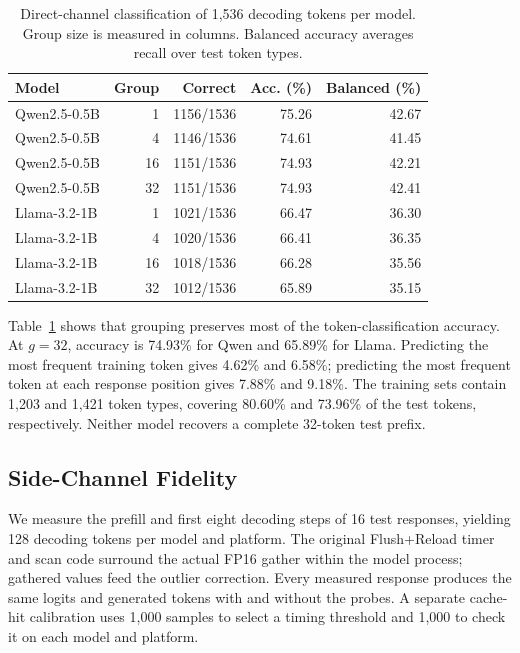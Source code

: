 \begin{table}[H]
    \centering\footnotesize\setlength{\tabcolsep}{3pt}
    \caption{Direct-channel classification of 1,536 decoding tokens per model. Group size is measured in columns. Balanced accuracy averages recall over test token types.}
    \label{tab:decoding-direct}
    \begin{tabular}{@{}lrrrr@{}}
        \hline
        Model & Group & Correct & Acc. (\%) & Balanced (\%) \\\hline
        Qwen2.5-0.5B & 1 & 1156/1536 & 75.26 & 42.67 \\
        Qwen2.5-0.5B & 4 & 1146/1536 & 74.61 & 41.45 \\
        Qwen2.5-0.5B & 16 & 1151/1536 & 74.93 & 42.21 \\
        Qwen2.5-0.5B & 32 & 1151/1536 & 74.93 & 42.41 \\
        Llama-3.2-1B & 1 & 1021/1536 & 66.47 & 36.30 \\
        Llama-3.2-1B & 4 & 1020/1536 & 66.41 & 36.35 \\
        Llama-3.2-1B & 16 & 1018/1536 & 66.28 & 35.56 \\
        Llama-3.2-1B & 32 & 1012/1536 & 65.89 & 35.15 \\
        \hline
    \end{tabular}
\end{table}

Table~\ref{tab:decoding-direct} shows that grouping preserves most of the token-classification accuracy.
At $g=32$, accuracy is 74.93\% for Qwen and 65.89\% for Llama.
Predicting the most frequent training token gives 4.62\% and 6.58\%; predicting the most frequent token at each response position gives 7.88\% and 9.18\%.
The training sets contain 1,203 and 1,421 token types, covering 80.60\% and 73.96\% of the test tokens, respectively.
Neither model recovers a complete 32-token test prefix.

\subsection{Side-Channel Fidelity}
\label{sec:decoding-fidelity}

We measure the prefill and first eight decoding steps of 16 test responses, yielding 128 decoding tokens per model and platform.
The original Flush+Reload timer and scan code surround the actual FP16 gather within the model process; gathered values feed the outlier correction.
Every measured response produces the same logits and generated tokens with and without the probes.
A separate cache-hit calibration uses 1,000 samples to select a timing threshold and 1,000 to check it on each model and platform.

